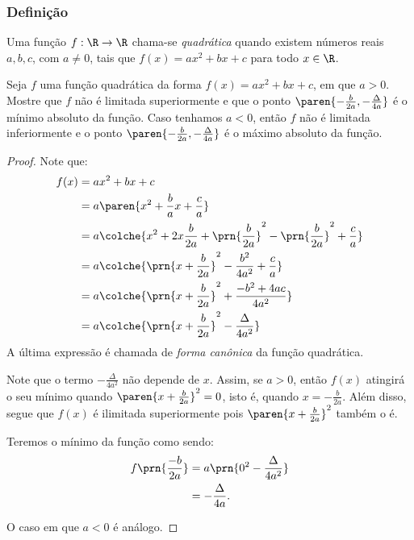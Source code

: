 \subsubsection{Definição}

\begin{definition}
Uma função $f: \R \to \R$ chama-se \emph{quadrática} quando existem
números reais $a, b, c$, com $a \neq 0$, tais que $f(x) = ax^2 +bx
+c$ para todo $x \in \R$.
\end{definition}

\begin{proposition}
Seja $f$ uma função quadrática da forma $f(x) = ax^2 + bx +c$, em que
$a >0$. Mostre que $f$ não é limitada superiormente e que o ponto
$\paren{-\frac {b} {2a}, -\frac {\Delta} {4a}}$ é o mínimo absoluto
da função. Caso tenhamos $a<0$, então $f$ não é limitada inferiormente e  o
ponto $\paren{-\frac {b} {2a}, -\frac {\Delta} {4a}}$ é o máximo
absoluto da função.
\end{proposition}

\begin{proof}
    Note que:
    \begin{align*}
        f(x) &= ax^2+bx+c\\
        &= a\paren{x^2 + \frac b a x + \frac c a} \\
        &= a\colche{x^2+2x\frac b {2a} + \prn{\frac b {2a}}^2  - \prn{\frac b {2a}}^2 + \frac c a} \\
        &= a\colche{\prn{x+\frac{b}{2a}}^2 - \frac{b^2}{4a^2}+\frac c a}\\
        &= a\colche{\prn{x+\frac{b}{2a}}^2 + \frac{-b^2+4ac}{4a^2}} \\
        &= a\colche{\prn{x+\frac{b}{2a}}^2 - \frac{\Delta}{4a^2}} \\
    \end{align*}
    \noindent A última expressão é chamada de \emph{forma canônica} da função quadrática.

    Note que o termo $-\frac{\Delta}{4a^2}$ não depende de $x$. 
    Assim, se $a>0$, então $f(x)$ atingirá o seu mínimo quando $\paren{x+\frac b {2a}}^2=0$, isto é, quando
    $x = -\frac b {2a}$. 
    Além disso, segue que $f(x)$ é ilimitada superiormente pois $\paren{x+\frac{b}{2a}}^2$ também o é.

    Teremos o mínimo da função como sendo:
    \begin{align*}
        f\prn{\frac{-b}{2a}} &= a\prn{0^2-\frac{\Delta}{4a^2}} \\ &= -\frac{\Delta}{4a}.
    \end{align*}

    O caso em que $a<0$ é análogo.
\end{proof}

